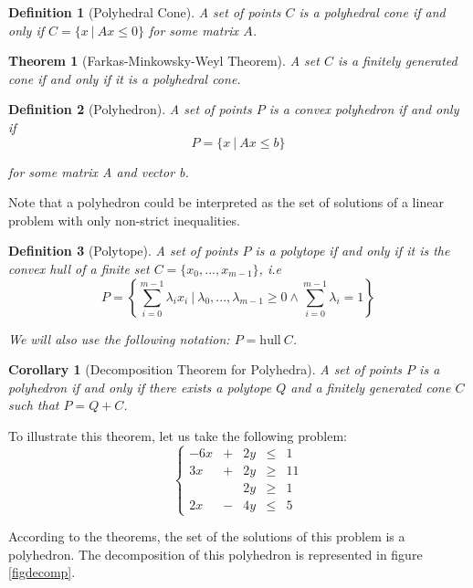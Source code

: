 \documentclass{article}
\newcommand{\hull}{\mathrm{hull}}
\newcommand{\ifff}{if and only if}
\newtheorem{definition}{Definition}
\newtheorem{theorem}{Theorem}
\newtheorem{corollary}{Corollary}
\begin{document}
\begin{definition}[Polyhedral Cone]
  A set of points $C$ is a \textsl{polyhedral cone}
  \ifff{} $C = \{x~|~Ax \leqslant 0\}$ for some matrix $A$.
\end{definition}

\begin{theorem}[Farkas-Minkowsky-Weyl Theorem]
  A set $C$ is a finitely generated cone \ifff{} it is a polyhedral cone.
\end{theorem}

\begin{definition}[Polyhedron]
  A set of points $P$ is a \textsl{convex polyhedron} \ifff{}
  $$P = \{x~|~Ax \leqslant b\}$$

  for some matrix A and vector b.
\end{definition}

Note that a polyhedron could be interpreted as the set of solutions of a linear
problem with only non-strict inequalities.

\begin{definition}[Polytope]
  A set of points $P$ is a \textsl{polytope} \ifff{} it is the convex hull of a
  finite set $C = \{x_0, ..., x_{m-1}\}$, \textit{i.e}
  $$P = \left\{
    \sum_{i=0}^{m-1} \lambda_i x_i~|~\lambda_0, ..., \lambda_{m-1} \geqslant 0
                                  \wedge \sum_{i=0}^{m-1} \lambda_i = 1
        \right\}$$

  We will also use the following notation: $P = \hull~C$.
\end{definition}

\begin{corollary}[Decomposition Theorem for Polyhedra]
  A set of points $P$ is a polyhedron \ifff{} there exists a polytope $Q$ and a
  finitely generated cone $C$ such that $P = Q + C$.
\end{corollary}

To illustrate this theorem, let us take the following problem:
\begin{equation} \label{eqdecomp}
  \left\{
  \begin{array}{rcccc}
    -6x & + & 2y & \leqslant & 1  \\
    3x  & + & 2y & \geqslant & 11 \\
        &   & 2y & \geqslant & 1  \\
    2x  & - & 4y & \leqslant & 5
  \end{array}
  \right.
\end{equation}

According to the theorems, the set of the solutions of this problem is a
polyhedron. The decomposition of this polyhedron is represented in figure
\ref{figdecomp}.
\end{document}
